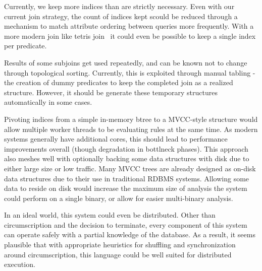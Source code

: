 Currently, we keep more indices than are strictly necessary.
Even with our current join strategy, the count of indices kept scould be reduced through a mechanism to match attribute ordering between queries more frequently.
With a more modern join like tetris join~\cite{tetris} it could even be possible to keep a single index per predicate.

Results of some subjoins get used repeatedly, and can be known not to change through topological sorting.
Currently, this is exploited through manual tabling - the creation of dummy predicates to keep the completed join as a realized structure.
However, it should be generate these temporary structures automatically in some cases.

Pivoting indices from a simple in-memory btree to a MVCC-style structure would allow multiple worker threads to be evaluating rules at the same time.
As modern systems generally have additional cores, this should lead to performance improvements overall (though degradation in bottlneck phases).
This approach also meshes well with optionally backing some data structures with disk due to either large size or low traffic.
Many MVCC trees are already designed as on-disk data structures due to their use in traditional RDBMS systems.
Allowing some data to reside on disk would increase the maximum size of analysis the system could perform on a single binary, or allow for easier multi-binary analysis.

In an ideal world, this system could even be distributed.
Other than circumscription and the decision to terminate, every component of this system can operate safely with a partial knowledge of the database.
As a result, it seems plausible that with appropriate heuristics for shuffling and synchronization around circumscription, this language could be well suited for distributed execution.
